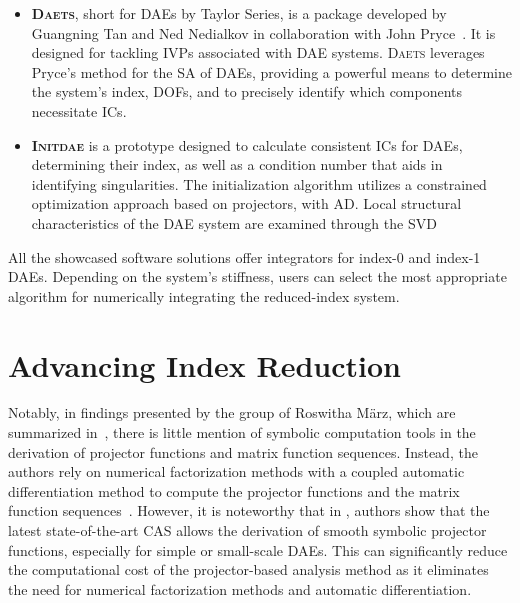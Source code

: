 \begin{itemize}
  \item \textbf{\textsc{Daets}}, short for \acp{DAE} by Taylor Series, is a \cpp{} package developed by Guangning Tan and Ned Nedialkov in collaboration with John Pryce~\cite{nedialkov2007solvingI, nedialkov2007solvingII, nedialkov2008solvingIII}. It is designed for tackling \acp{IVP} associated with \ac{DAE} systems. \textsc{Daets} leverages Pryce's method for the \ac{SA} of \acp{DAE}, providing a powerful means to determine the system's index, \acp{DOF}, and to precisely identify which components necessitate \acp{IC}.
  \item \textbf{\textsc{Initdae}} is a \Python{} prototype designed to calculate consistent \acp{IC} for \acp{DAE}, determining their index, as well as a condition number that aids in identifying singularities. The initialization algorithm utilizes a constrained optimization approach based on projectors, with \ac{AD}. Local structural characteristics of the \ac{DAE} system are examined through the \ac{SVD}~\cite{estvezschwarz2021initdae}
\end{itemize}
%
All the showcased software solutions offer integrators for index-0 and index-1 \acp{DAE}. Depending on the system's stiffness, users can select the most appropriate algorithm for numerically integrating the reduced-index system.


\section{Advancing Index Reduction}

Notably, in findings presented by the group of Roswitha M{\"a}rz, which are summarized in~\cite{lamour2013differential}, there is little mention of symbolic computation tools in the derivation of projector functions and matrix function sequences. Instead, the authors rely on numerical factorization methods with a coupled automatic differentiation method to compute the projector functions and the matrix function sequences~\cite{lamour2011computational, schwarz2015diagnosis}. However, it is noteworthy that in \citet{lamour2013differential}, authors show that the latest state-of-the-art \ac{CAS} allows the derivation of smooth symbolic projector functions, especially for simple or small-scale \acp{DAE}. This can significantly reduce the computational cost of the projector-based analysis method as it eliminates the need for numerical factorization methods and automatic differentiation.

